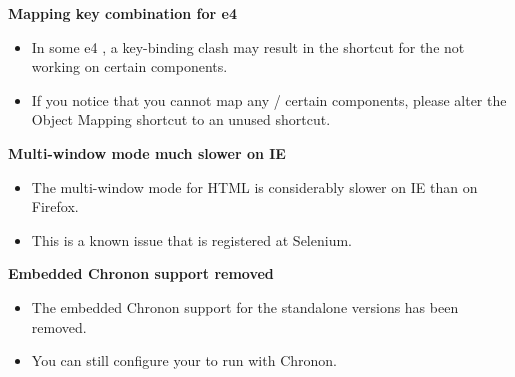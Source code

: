 
\textbf{Mapping key combination for e4 \gdauts{}}
\begin{itemize}
\item In some e4 \gdauts{}, a key-binding clash may result in the shortcut for the \gdomm{} not working on certain components. 
\item If you notice that you cannot map any / certain components, please alter the Object Mapping shortcut to an unused shortcut. 
\end{itemize}

\textbf{Multi-window mode much slower on IE}
\begin{itemize}
\item The multi-window mode for HTML \gdauts{} is considerably slower on IE than on Firefox.
\item This is a known issue that is registered at Selenium. 
\end{itemize}

\textbf{Embedded Chronon support removed}
\begin{itemize}
\item The embedded Chronon support for the standalone versions has been removed.
\item You can still configure your \gdaut{} to run with Chronon.
\end{itemize}
